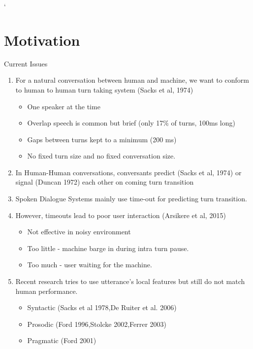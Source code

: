 `%

\section{Motivation}
\frame{\sectionpage}




\begin{frame}{Current Issues}
    \begin{enumerate}
      \item For a natural conversation between human and machine, we want to conform
            to human to human turn taking system (Sacks et al, 1974)
                \begin{itemize}
                    \item One speaker at the time
                    \item Overlap speech is common but brief (only 17\% of turns, 100ms long)
                    \item Gaps between turns kept to a minimum (200 ms)
                    \item No fixed turn size and no fixed conversation size.
                \end{itemize}
      \item In Human-Human conversations, conversants predict (Sacks et al, 1974) or
            signal (Duncan 1972) each other on coming turn transition
      \item Spoken Dialogue Systems mainly use time-out for predicting turn transition.      
      \item {
        However, timeouts lead to poor user interaction (Arsikere et al, 2015)
        \begin{itemize}
            \item Not effective in noisy environment
            \item Too little - machine barge in during intra turn pause.
            \item Too much - user waiting for the machine.
        \end{itemize}
      }
      \item {
        Recent research tries to use utterance's local features but still do not match human performance.
        \begin{itemize}
            \item Syntactic (Sacks et al 1978,De Ruiter et al. 2006)
            \item Prosodic (Ford 1996,Stolcke 2002,Ferrer 2003)
            \item Pragmatic (Ford 2001)
        \end{itemize}
      }
    \end{enumerate}
\end{frame}

